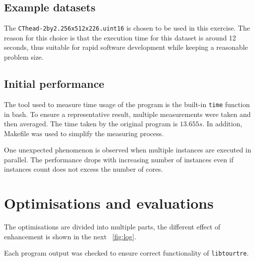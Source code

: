 \documentclass[conference]{IEEEtran}
\newcommand{\fref}[1]{\figurename~\ref{#1}}
\begin{document}
\subsection{Example datasets}

The \texttt{CThead-2by2.256x512x226.uint16} is chosen to be used in this exercise. The reason for this choice is that the execution time for this dataset is around 12 seconds, thus suitable for rapid software development while keeping a reasonable problem size.

\subsection{Initial performance}

The tool used to measure time usage of the program is the built-in \texttt{time} function in bash. To ensure a representative result, multiple measurements were taken and then averaged. The time taken by the original program is $13.655 s$. In addition, Makefile was used to simplify the measuring process.

One unexpected phenomenon is observed when multiple instances are executed in parallel. The performance drops with increasing number of instances even if instances count does not excess the number of cores.

\section{Optimisations and evaluations}

The optimisations are divided into multiple parts, the different effect of enhancement is shown in the next \fref{fig:log}. 

Each program output was checked to ensure correct functionality of \texttt{libtourtre}.
\end{document}
